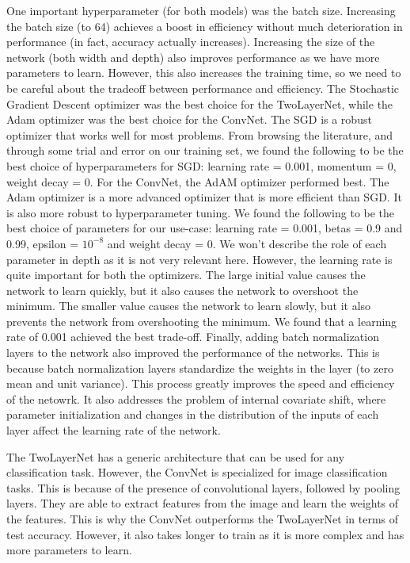 \documentclass{article}
\begin{document}
One important hyperparameter (for both models) was the batch size. Increasing the batch size (to 64) achieves a boost in efficiency without much deterioration in performance (in fact, accuracy actually increases). Increasing the size of the network (both width and depth) also improves performance as we have more parameters to learn. However, this also increases the training time, so we need to be careful about the tradeoff between performance and efficiency. The Stochastic Gradient Descent optimizer was the best choice for the TwoLayerNet, while the Adam optimizer was the best choice for the ConvNet. The SGD is a robust optimizer that works well for most problems. From browsing the literature, and through some trial and error on our training set, we found the following to be the best choice of hyperparameters for SGD: learning rate = 0.001, momentum = 0, weight decay = 0.  For the ConvNet, the AdAM optimizer performed best. The Adam optimizer is a more advanced optimizer that is more efficient than SGD. It is also more robust to hyperparameter tuning. We found the following to be the best choice of parameters for our use-case: learning rate = 0.001, betas = 0.9 and 0.99, epsilon = $10^{-8}$ and weight decay = 0. We won't describe the role of each parameter in depth as it is not very relevant here. However, the learning rate is quite important for both the optimizers. The large initial value causes the network to learn quickly, but it also causes the network to overshoot the minimum. The smaller value causes the network to learn slowly, but it also prevents the network from overshooting the minimum. We found that a learning rate of 0.001 achieved the best trade-off. Finally, adding batch normalization layers to the network also improved the performance of the networks. This is because batch normalization layers standardize the weights in the layer (to zero mean and unit variance). This process greatly improves the speed and efficiency of the netowrk. It also addresses the problem of internal covariate shift, where parameter initialization and changes in the distribution of the inputs of each layer affect the learning rate of the network.

The TwoLayerNet has a generic architecture that can be used for any classification task. However, the ConvNet is specialized for image classification tasks. This is because of the presence of convolutional layers, followed by pooling layers. They are able to extract features from the image and learn the weights of the features. This is why the ConvNet outperforms the TwoLayerNet in terms of test accuracy. However, it also takes longer to train as it is more complex and has more parameters to learn.
\end{document}
